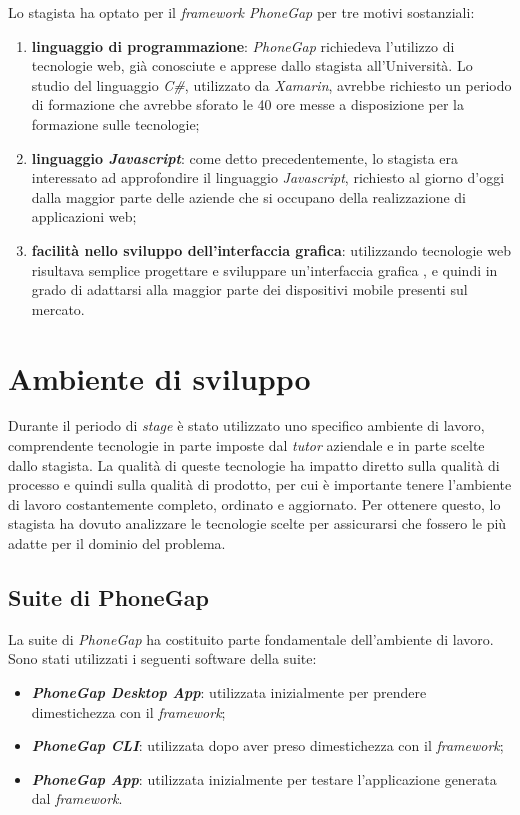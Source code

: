 Lo stagista ha optato per il \textit{framework PhoneGap} per tre motivi sostanziali:
\begin{enumerate}
	\item \textbf{linguaggio di programmazione}: \textit{PhoneGap} richiedeva l'utilizzo di tecnologie web, già conosciute e apprese dallo stagista all'Università. Lo studio del linguaggio \textit{C\#}, utilizzato da \textit{Xamarin}, avrebbe richiesto un periodo di formazione che avrebbe sforato le 40 ore messe a disposizione per la formazione sulle tecnologie;
	\item \textbf{linguaggio \textit{Javascript}}: come detto precedentemente, lo stagista era interessato ad approfondire il linguaggio \textit{Javascript}, richiesto al giorno d'oggi dalla maggior parte delle aziende che si occupano della realizzazione di applicazioni web;
	\item \textbf{facilità nello sviluppo dell'interfaccia grafica}: utilizzando tecnologie web risultava semplice progettare e sviluppare un'interfaccia grafica , e quindi in grado di adattarsi alla maggior parte dei dispositivi mobile presenti sul mercato.
\end{enumerate}

\section{Ambiente di sviluppo}

Durante il periodo di \textit{stage} è stato utilizzato uno specifico ambiente di lavoro, comprendente tecnologie in parte imposte dal \textit{tutor} aziendale e in parte scelte dallo stagista. La qualità di queste tecnologie ha impatto diretto sulla qualità di processo e quindi sulla qualità di prodotto, per cui è importante tenere l'ambiente di lavoro costantemente completo, ordinato e aggiornato. Per ottenere questo, lo stagista ha dovuto analizzare le tecnologie scelte per assicurarsi che fossero le più adatte per il dominio del problema.

\subsection{Suite di PhoneGap}

La suite di \textit{PhoneGap} ha costituito parte fondamentale dell'ambiente di lavoro. Sono stati utilizzati i seguenti software della suite:
\begin{itemize}
	\item \textbf{\textit{PhoneGap Desktop App}}: utilizzata inizialmente per prendere dimestichezza con il \textit{framework};
	\item \textbf{\textit{PhoneGap CLI}}: utilizzata dopo aver preso dimestichezza con il \textit{framework};
	\item \textbf{\textit{PhoneGap App}}: utilizzata inizialmente per testare l'applicazione generata dal \textit{framework}.
\end{itemize}


